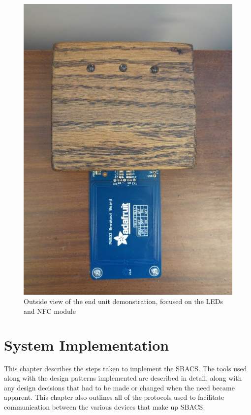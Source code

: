 \documentclass[12pt]{report}
\begin{document}
\begin{figure}
    \includegraphics[width=\textwidth]{Diagrams/end_unit_leds}
    \caption[End unit LEDs and NFC module]{Outside view of the end unit demonstration, focused on the LEDs and NFC module}
    \label{fig:end-unit-leds}
\end{figure}


\chapter{System Implementation} \label{system-implementation}

This chapter describes the steps taken to implement the SBACS. The tools used along with the design patterns implemented
are described in detail, along with any design decisions that had to be made or changed when the need became apparent.
This chapter also outlines all of the protocols used to facilitate communication between the various devices that make
up SBACS.
\end{document}
